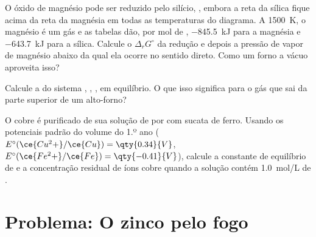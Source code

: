 \begin{exercise}[$\star\star\star$]\label{exo:b2:ellingham:10}
O óxido de magnésio pode ser reduzido pelo silício, , embora
a reta da sílica fique acima da reta da magnésia em todas as temperaturas do
diagrama. A \qty{1500}{K}, o magnésio é um gás e as tabelas dão, por mol de
, \qty{-845.5}{kJ} para a magnésia e \qty{-643.7}{kJ} para a sílica.
Calcule o $\Delta_r G^\circ$ da redução e depois a pressão de vapor de
magnésio abaixo da qual ela ocorre no sentido direto. Como um forno a vácuo
aproveita isso?
\end{exercise}

\begin{exercise}[$\star\star\star$]\label{exo:b2:ellingham:11}
Calcule a  do sistema , , ,
 em equilíbrio. O que isso significa para o gás que sai da parte
superior de um alto-forno?
\end{exercise}

\begin{exercise}[$\star\star\star$]\label{exo:b2:ellingham:12}
O cobre é purificado de sua solução de  por  com sucata
de ferro. Usando os potenciais padrão do volume do 1.º ano ($E^\circ(\ce{Cu^2+}/\ce{Cu})
= \qty{0.34}{V}$, $E^\circ(\ce{Fe^2+}/\ce{Fe}) = \qty{-0.41}{V}$), calcule a
constante de equilíbrio de  e a concentração
residual de íons cobre quando a solução contém \qty{1.0}{mol/L} de
.
\end{exercise}

\section{Problema: O zinco pelo fogo}

